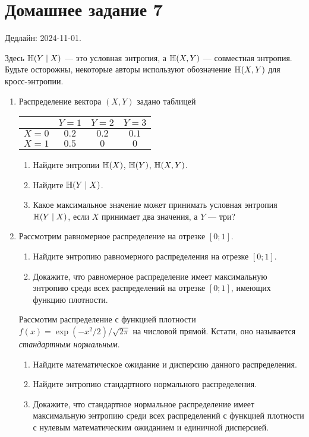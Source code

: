 \section*{Домашнее задание 7}

Дедлайн: 2024-11-01.

Здесь $\operatorname{\mathbb{H}}(Y \mid X)$ — это условная энтропия, а $\operatorname{\mathbb{H}}(X, Y)$ — совместная энтропия. 
Будьте осторожны, некоторые авторы используют обозначение $\operatorname{\mathbb{H}}(X, Y)$ для кросс-энтропии. 


\begin{enumerate}
\item Распределение вектора $(X, Y)$ задано таблицей

\begin{center}
    \begin{tabular}{lccc}
    	\toprule
    	    & $Y = 1$  & $Y = 2$  & $Y = 3$ \\
        \midrule
    	$X = 0$ & $0.2$  & $0.2$  & $0.1$ \\
        $X = 1$ & $0.5$  &  $0$   & $0$ \\
      \bottomrule
    \end{tabular}
\end{center}

\begin{enumerate}
    \item Найдите энтропии $\operatorname{\mathbb{H}}(X)$, $\operatorname{\mathbb{H}}(Y)$, $\operatorname{\mathbb{H}}(X, Y)$.
    \item Найдите $\operatorname{\mathbb{H}}(Y \mid X)$.
    \item Какое максимальное значение может принимать условная энтропия $\operatorname{\mathbb{H}}(Y \mid X)$, 
    если $X$ принимает два значения, а $Y$ — три?
\end{enumerate}

\item Рассмотрим равномерное распределение на отрезке $[0; 1]$.

\begin{enumerate}
    \item Найдите энтропию равномерного распределения на отрезке $[0; 1]$.
    \item Докажите, что равномерное распределение имеет максимальную энтропию среди всех распределений на отрезке $[0; 1]$,
    имеющих функцию плотности. 
\end{enumerate}

Рассмотим распределение с функцией плотности $f(x) = \exp(-x^2/2)/\sqrt{2\pi}$ на числовой прямой. 
Кстати, оно называется \emph{стандартным нормальным}. 

\begin{enumerate}[resume]
    \item Найдите математическое ожидание и дисперсию данного распределения. 
    \item Найдите энтропию стандартного нормального распределения.     
    \item Докажите, что стандартное нормальное распределение имеет максимальную энтропию среди всех распределений с функцией плотности с нулевым математическим ожиданием и единичной дисперсией.
\end{enumerate}


\end{enumerate}
